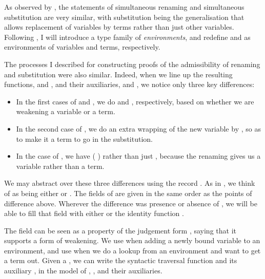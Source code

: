 As observed by \citet{McBride05,BHKM12},
the statements of simultaneous renaming and simultaneous substitution are
very similar, with substitution being the generalisation that allows
replacement of variables by terms rather than just other variables.
Following \citet{McBride05},
I will introduce a type family  of \emph{environments}, and
redefine  and  as environments of
variables and terms, respectively.

\Env{}
\RenSub{}

The processes I described for constructing proofs of the admissibility of
renaming and substitution were also similar.
Indeed, when we line up the resulting functions,  and
, and their auxiliaries,  and
, we notice only three key
differences:

\begin{itemize}
  \item In the first cases of  and ,
    we do  and , respectively, based on
    whether we are weakening a variable or a term.
  \item In the second case of , we do an extra wrapping of
    the new variable by , so as to make it a term
    to go in the substitution.
  \item In the  case of , we
    have  \AgdaSymbol(\AgdaBound{$\rho$}
    \AgdaSymbol) rather than just \AgdaBound{$\rho$} ,
    because the renaming \AgdaBound{$\rho$} gives us a variable rather than a
    term.
\end{itemize}

We may abstract over these three differences using the record .
As in , we think of  as being either
\AgdaDatatype{\_$\ni$\_} or \AgdaDatatype{\_$\vdash$\_}.
The fields of  are given in the same order as the points of
difference above.
Wherever the difference was presence or absence of
, we will be able to fill that field with either
 or the identity function .

\Kit{}

The field  can be seen as a property of the
judgement form , saying that it supports a form of weakening.
We use  when adding a newly bound variable to an environment, and
use  when we do a lookup from an environment and want to get a
term out.
Given a  , we can write the syntactic traversal
function  and its auxiliary , in the
model of , , and their auxiliaries.

